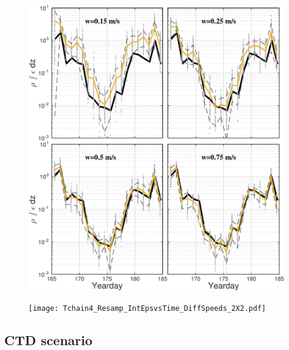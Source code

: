 \documentclass[11pt]{article}
\begin{document}
\begin{figure}[htbp]
\includegraphics[scale=0.8]{Tchain3_Resamp_IntEpsvsTime_DiffSpeeds_2X2.pdf}
\caption{}
\label{}
\end{figure}

\begin{figure}[htbp]
\texttt{[image: Tchain4\_Resamp\_IntEpsvsTime\_DiffSpeeds\_2X2.pdf]}
\caption{}
\label{}
\end{figure}


\subsection{CTD scenario}
\end{document}
